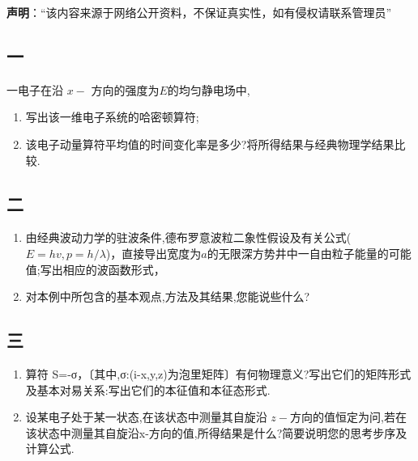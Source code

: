 
\textbf{声明}：“该内容来源于网络公开资料，不保证真实性，如有侵权请联系管理员”

\subsection{一}
一电子在沿 $x-$ 方向的强度为$E$的均匀静电场中,
\begin{enumerate}
\item 写出该一维电子系统的哈密顿算符;
\item 该电子动量算符平均值的时间变化率是多少?将所得结果与经典物理学结果比较.
\end{enumerate}
\subsection{二}
\begin{enumerate}
\item 由经典波动力学的驻波条件,德布罗意波粒二象性假设及有关公式($E=hv,p=h/\lambda$)，直接导出宽度为$a$的无限深方势井中一自由粒子能量的可能值;写出相应的波函数形式，
\item 对本例中所包含的基本观点,方法及其结果,您能说些什么?
\end{enumerate}
\subsection{三}
\begin{enumerate}
\item 算符 S=-σ，〔其中,σ:(i-x,y,z)为泡里矩阵〕有何物理意义?写出它们的矩阵形式及基本对易关系:写出它们的本征值和本征态形式.
\item 设某电子处于某一状态,在该状态中测量其自旋沿 $z-$方向的值恒定为问,若在该状态中测量其自旋沿x-方向的值,所得结果是什么?简要说明您的思考步序及计算公式.
\end{enumerate}
